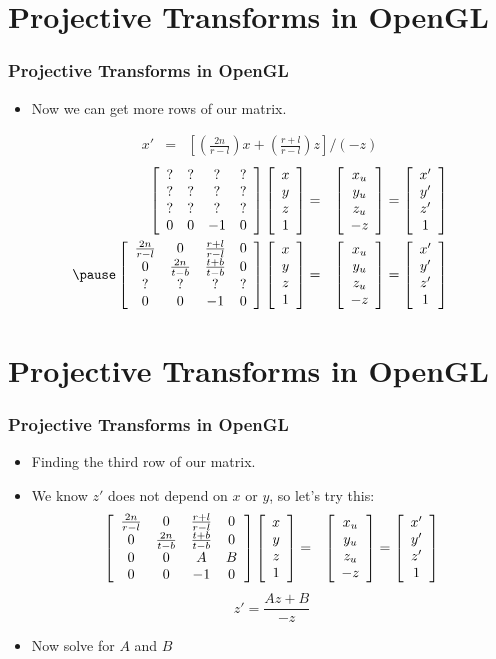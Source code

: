 \documentclass[slidestop,xcolor=pst]{beamer}
\newcommand{\sect}[1]{
\section{#1}
\begin{frame}[fragile]\frametitle{#1}
}
\begin{document}
\sect{Projective Transforms in OpenGL}
\begin{itemize}
\item Now we can get more rows of our matrix.
\end{itemize}
\begin{eqnarray*}
 x'  &=& \left[\left(\frac{2n}{r-l}\right)x
      + \left(\frac{r+l}{r-l}\right)z\right]/(-z)
\end{eqnarray*}
\begin{eqnarray*}
\wmhomo
{?&?&?&?}
{?&?&?&?}
{?&?&?&?}
{0&0&-1&0}
\phomo{x\\y\\z}
&=&\whomo{x_u\\y_u\\z_u\\-z}
=\whomo{x'\\y'\\z'\\1}\\
\pause
\wmhomo
{\frac{2n}{r-l}& 0 & \frac{r+l}{r-l}& 0}
{0 & \frac{2n}{t-b}&\frac{t+b}{t-b}& 0}
{?&?&?&?}
{0&0&-1&0}
\phomo{x\\y\\z}
&=&\whomo{x_u\\y_u\\z_u\\-z}
=\whomo{x'\\y'\\z'\\1}\\
  \end{eqnarray*}
\end{frame}

\sect{Projective Transforms in OpenGL}
\begin{itemize}
\item Finding the third row of our matrix.
\item We know $z'$ does not depend on $x$ or $y$, so let's try this:
\begin{eqnarray*}
\left[\begin{array}{cccc} \frac{2n}{r-l}& 0 & \frac{r+l}{r-l}& 0 \\ 0 & \frac{2n}{t-b}&\frac{t+b}{t-b}& 0 \\ 0&0&A&B \\ 0&0&-1&0\end{array}\right]
\left[\begin{array}{c} x\\y\\z \\ 1\end{array}\right]
&=&\left[\begin{array}{c} x_u\\y_u\\z_u\\-z \end{array}\right]
=\left[\begin{array}{c} x'\\y'\\z' \\ 1\end{array}\right]
  \end{eqnarray*}
\[
z' =\frac{Az + B}{-z}
\]
\item Now solve for $A$ and $B$
\end{itemize}
\end{frame}
\end{document}
